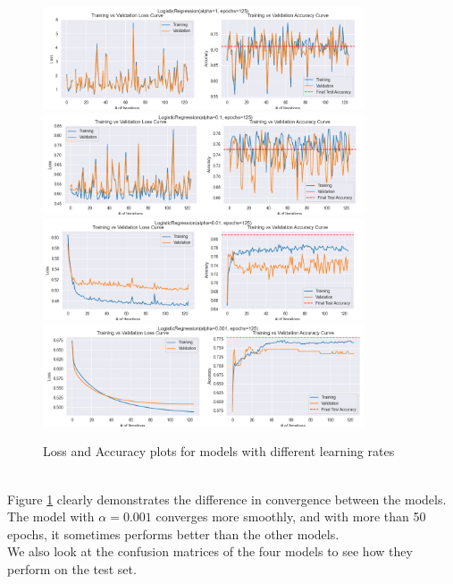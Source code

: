 \documentclass[12pt]{article}
\begin{document}
    \begin{figure}[h]
        \centering
        \includegraphics[width=0.85\textwidth]{./../Assets/model_1.png}
        \includegraphics[width=0.85\textwidth]{./../Assets/model_2.png}
        \includegraphics[width=0.85\textwidth]{./../Assets/model_3.png}
        \includegraphics[width=0.85\textwidth]{./../Assets/model_4.png}
        \caption{Loss and Accuracy plots for models with different learning rates}
        \label{fig:models}
    \end{figure}
    \vspace*{5pt} \\
    Figure \ref{fig:models} clearly demonstrates the difference in convergence between the models.
    The model with $\alpha = 0.001$ converges more smoothly, and with more than 50 epochs, it sometimes performs better
    than the other models.
    \vspace*{5pt} \\
    We also look at the confusion matrices of the four models to see how they perform on the test set.
\end{document}
